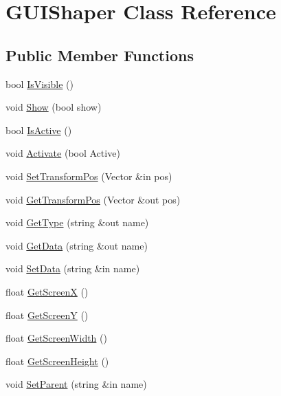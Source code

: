 \hypertarget{class_g_u_i_shaper}{}\section{G\+U\+I\+Shaper Class Reference}
\label{class_g_u_i_shaper}
\subsection*{Public Member Functions}
\begin{DoxyCompactItemize}
\item 
bool \hyperlink{class_g_u_i_shaper_ae30e61d8b953bfaff7c9e46cdbf57c2f}{Is\+Visible} ()
\item 
void \hyperlink{class_g_u_i_shaper_a7d7781cc70278569363830f0ac0ff06c}{Show} (bool show)
\item 
bool \hyperlink{class_g_u_i_shaper_ac249fbdfb1b974a75b74dadc4d707a75}{Is\+Active} ()
\item 
void \hyperlink{class_g_u_i_shaper_a0cb0dc27480f4690e07ddb93ae21fa8a}{Activate} (bool Active)
\item 
void \hyperlink{class_g_u_i_shaper_ab4227f4e7896ef5ecf915c18adfcf026}{Set\+Transform\+Pos} (Vector \&in pos)
\item 
void \hyperlink{class_g_u_i_shaper_afdd4c4a801b3cd09a39890a08841e47b}{Get\+Transform\+Pos} (Vector \&out pos)
\item 
void \hyperlink{class_g_u_i_shaper_a6f06b8b7dcbb268b0b622f511ab09173}{Get\+Type} (string \&out name)
\item 
void \hyperlink{class_g_u_i_shaper_a3b3f189322dc26e10726d2f972a627b0}{Get\+Data} (string \&out name)
\item 
void \hyperlink{class_g_u_i_shaper_a862a1b159822d33d40b8d4511cd26216}{Set\+Data} (string \&in name)
\item 
float \hyperlink{class_g_u_i_shaper_af8fed463aacf92415fbf3c35bfcaf12d}{Get\+ScreenX} ()
\item 
float \hyperlink{class_g_u_i_shaper_a48b2f7ad23a15a41c6cea088df60d917}{Get\+ScreenY} ()
\item 
float \hyperlink{class_g_u_i_shaper_a3f42fc477d646f6807d69558398bbe28}{Get\+Screen\+Width} ()
\item 
float \hyperlink{class_g_u_i_shaper_a28a1f8639b5cd605b6dd5079549e7ad8}{Get\+Screen\+Height} ()
\item 
void \hyperlink{class_g_u_i_shaper_aa6f4827cc55f0f8a2ba546ae3a7817ea}{Set\+Parent} (string \&in name)
\item 

\end{DoxyCompactItemize}
